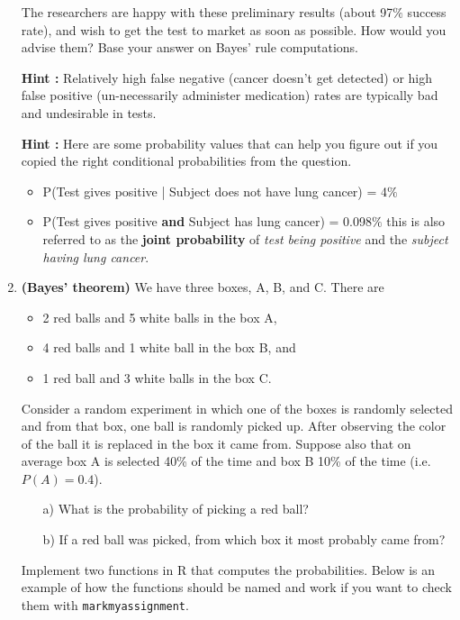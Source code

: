\documentclass[11pt,a4paper,english]{article}\usepackage[]{graphicx}\usepackage[]{xcolor}
\begin{document}
\begin{enumerate}
  The researchers are happy with these preliminary results (about 97$\%$
  success rate), and wish to get the test to market as soon as possible. How would you advise them? Base your answer on Bayes' rule computations.

{\bf Hint :} Relatively high false negative (cancer doesn't get detected) or high false positive (un-necessarily administer medication) rates are typically bad and undesirable in tests.

{\bf Hint :} Here are some probability values that can help you figure out if you copied the right conditional probabilities from the question.
  \begin{itemize}
    \item P(Test gives positive | Subject does not have lung cancer) = 4$\%$
    \item P(Test gives positive {\bf and} Subject has lung cancer) = 0.098$\%$ this is also referred to as the {\bf joint probability} of {\it test being positive} and the {\it subject having lung cancer}.
  \end{itemize}

\item {\bf (Bayes' theorem)} We have three boxes, A, B, and C. There are
  \begin{itemize}
    \item 2 red balls and 5 white balls in the box A,
    \item 4 red balls and 1 white ball in the box B, and
    \item 1 red ball and 3 white balls in the box C.
  \end{itemize}
Consider a random experiment in which one of the boxes is randomly
selected and from that box, one ball is randomly picked up. After
observing the color of the ball it is replaced in the box it came
from. Suppose also that on average box A is selected 40\% of the time
and box B 10\% of the time (i.e. $P(A) = 0.4$).

\begin{itemize}
\item[a)] What is the probability of picking a red ball?
\item[b)] If a red ball was picked, from which box it most probably came from?
\end{itemize}

Implement two functions in R that computes the probabilities. Below is an example of how the functions should be named and work if you want to check them with \texttt{markmyassignment}.


\end{enumerate}
\end{document}
